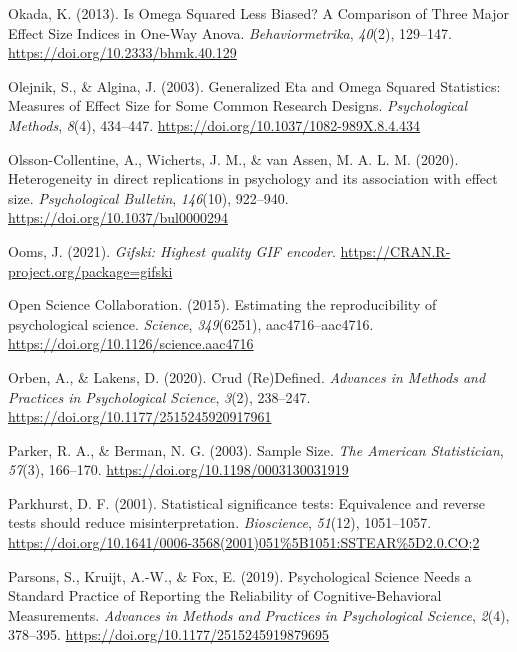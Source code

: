 \documentclass[
  oneside]{krantz}
\newlength{\cslhangindent}
\newlength{\cslentryspacingunit} %
\newenvironment{CSLReferences}[2] %
 {%
  \setlength{\parindent}{0pt}
  \ifodd #1
  \let\oldpar\par
  \def\par{\hangindent=\cslhangindent\oldpar}
  \fi
  \setlength{\parskip}{#2\cslentryspacingunit}
 }%
 {}
\begin{document}
\begin{CSLReferences}{1}{0}
\leavevmode{}%
Okada, K. (2013). Is {Omega Squared Less Biased}? A {Comparison} of
{Three Major Effect Size Indices} in {One-Way Anova}.
\emph{Behaviormetrika}, \emph{40}(2), 129--147.
\url{https://doi.org/10.2333/bhmk.40.129}

\leavevmode{}%
Olejnik, S., \& Algina, J. (2003). Generalized {Eta} and {Omega Squared
Statistics}: {Measures} of {Effect Size} for {Some Common Research
Designs}. \emph{Psychological Methods}, \emph{8}(4), 434--447.
\url{https://doi.org/10.1037/1082-989X.8.4.434}

\leavevmode{}%
Olsson-Collentine, A., Wicherts, J. M., \& van Assen, M. A. L. M.
(2020). Heterogeneity in direct replications in psychology and its
association with effect size. \emph{Psychological Bulletin},
\emph{146}(10), 922--940. \url{https://doi.org/10.1037/bul0000294}

\leavevmode{}%
Ooms, J. (2021). \emph{Gifski: Highest quality GIF encoder}.
\url{https://CRAN.R-project.org/package=gifski}

\leavevmode{}%
Open Science Collaboration. (2015). Estimating the reproducibility of
psychological science. \emph{Science}, \emph{349}(6251),
aac4716--aac4716. \url{https://doi.org/10.1126/science.aac4716}

\leavevmode{}%
Orben, A., \& Lakens, D. (2020). Crud ({Re}){Defined}. \emph{Advances in
Methods and Practices in Psychological Science}, \emph{3}(2), 238--247.
\url{https://doi.org/10.1177/2515245920917961}

\leavevmode{}%
Parker, R. A., \& Berman, N. G. (2003). Sample {Size}. \emph{The
American Statistician}, \emph{57}(3), 166--170.
\url{https://doi.org/10.1198/0003130031919}

\leavevmode{}%
Parkhurst, D. F. (2001). Statistical significance tests: {Equivalence}
and reverse tests should reduce misinterpretation. \emph{Bioscience},
\emph{51}(12), 1051--1057.
\url{https://doi.org/10.1641/0006-3568(2001)051\%5B1051:SSTEAR\%5D2.0.CO;2}

\leavevmode{}%
Parsons, S., Kruijt, A.-W., \& Fox, E. (2019). Psychological {Science
Needs} a {Standard Practice} of {Reporting} the {Reliability} of
{Cognitive-Behavioral Measurements}. \emph{Advances in Methods and
Practices in Psychological Science}, \emph{2}(4), 378--395.
\url{https://doi.org/10.1177/2515245919879695}


\end{CSLReferences}
\end{document}
